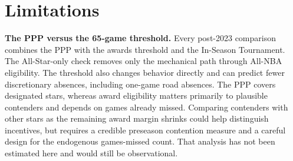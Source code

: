 \documentclass[11pt]{article}
\begin{document}
\FloatBarrier
\section{Limitations}\label{sec:limitations}

\noindent\textbf{The PPP versus the 65-game threshold.} Every post-2023 comparison combines the PPP with the awards threshold and the In-Season Tournament. The All-Star-only check removes only the mechanical path through All-NBA eligibility. The threshold also changes behavior directly and can predict fewer discretionary absences, including one-game road absences. The PPP covers designated stars, whereas award eligibility matters primarily to plausible contenders and depends on games already missed. Comparing contenders with other stars as the remaining award margin shrinks could help distinguish incentives, but requires a credible preseason contention measure and a careful design for the endogenous games-missed count. That analysis has not been estimated here and would still be observational.
\end{document}
